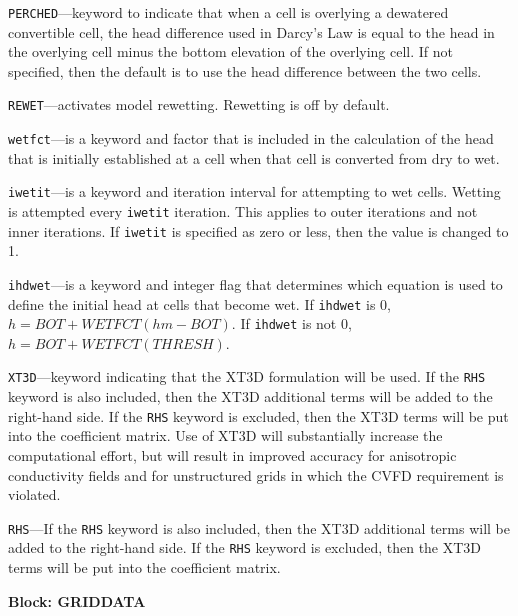 \begin{description}
\item \texttt{PERCHED}---keyword to indicate that when a cell is overlying a dewatered convertible cell, the head difference used in Darcy's Law is equal to the head in the overlying cell minus the bottom elevation of the overlying cell.  If not specified, then the default is to use the head difference between the two cells.

\item \texttt{REWET}---activates model rewetting.  Rewetting is off by default.

\item \texttt{wetfct}---is a keyword and factor that is included in the calculation of the head that is initially established at a cell when that cell is converted from dry to wet.

\item \texttt{iwetit}---is a keyword and iteration interval for attempting to wet cells. Wetting is attempted every \texttt{iwetit} iteration. This applies to outer iterations and not inner iterations. If \texttt{iwetit} is specified as zero or less, then the value is changed to 1.

\item \texttt{ihdwet}---is a keyword and integer flag that determines which equation is used to define the initial head at cells that become wet.  If \texttt{ihdwet} is 0, $h = BOT + WETFCT (hm - BOT)$. If \texttt{ihdwet} is not 0, $h = BOT + WETFCT (THRESH)$.

\item \texttt{XT3D}---keyword indicating that the XT3D formulation will be used.  If the \texttt{RHS} keyword is also included, then the XT3D additional terms will be added to the right-hand side.  If the \texttt{RHS} keyword is excluded, then the XT3D terms will be put into the coefficient matrix.  Use of XT3D will substantially increase the computational effort, but will result in improved accuracy for anisotropic conductivity fields and for unstructured grids in which the CVFD requirement is violated.

\item \texttt{RHS}---If the \texttt{RHS} keyword is also included, then the XT3D additional terms will be added to the right-hand side.  If the \texttt{RHS} keyword is excluded, then the XT3D terms will be put into the coefficient matrix.

\end{description}
\item \textbf{Block: GRIDDATA}

